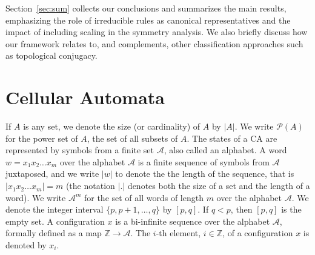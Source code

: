\documentclass[a4paper]{article}
\begin{document}
Section~\ref{sec:sum} collects our conclusions and summarizes the main results, emphasizing
the role of irreducible rules as canonical representatives and the impact of
including scaling in the symmetry analysis. We also briefly discuss how our
framework relates to, and complements, other classification approaches such as
topological conjugacy.

\section{Cellular Automata}
\label{sec:CA}

If $A$ is any set, we denote the size (or cardinality) of $A$ by $|A|$.
We write $\mathcal{P}(A)$ for the power set of $A$, the set of all subsets of $A$.
The states of a CA are represented by symbols from a finite set $\mathcal{A}$, also called an alphabet.
A word $w=x_1x_2\ldots x_{m}$ over the alphabet $\mathcal{A}$ is a finite sequence of symbols
from $\mathcal{A}$ juxtaposed, and we write $|w|$ to denote the  the length of the sequence,
that is $|x_1x_2\ldots x_{m}| = m$
(the notation $|.|$ denotes both the size of a set and the length of a word).
We write $\mathcal{A}^m$ for the set of all words of length $m$ over the alphabet $\mathcal{A}$.
We denote the integer interval $\{p, p+1, \ldots, q\}$ by $[p,q]$.
If $q < p$, then $[p,q]$ is the empty set.
A configuration $x$ is a bi-infinite sequence over
the alphabet $\mathcal{A}$, formally defined as a map $\mathbb{Z} \to \mathcal{A}$.
The $i$-th element, $i \in \mathbb{Z}$, of a configuration $x$ is denoted by $x_i$.

\end{document}
